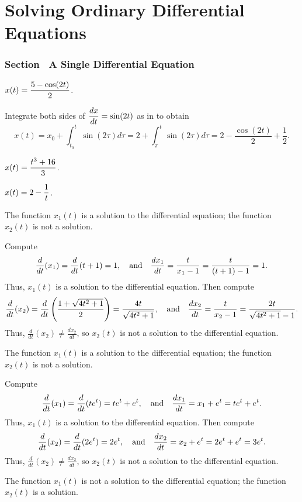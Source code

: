 \chapter{Solving Ordinary Differential Equations}

\subsection*{Section~\protect{\ref{S:growthmodels}} A Single Differential
Equation}

\ans $\displaystyle x(t) = \frac{5 - \cos(2t)}{2}$.

\soln Integrate both sides of $\displaystyle\frac{dx}{dt} = \sin(2t)$ as in
 to obtain
\[
x(t) = x_0 + \int_{t_0}^{t}\sin(2\tau)d\tau =
2 + \int_{\pi}^{t}\sin(2\tau)d\tau = 2 - \frac{\cos(2t)}{2} +
\frac{1}{2}.
\]

 $\displaystyle x(t) = \frac{t^3 + 16}{3}$.

 $\displaystyle x(t) = 2 - \frac{1}{t}$.

\ans The function $x_1(t)$ is a solution to the differential equation;
the function $x_2(t)$ is not a solution.

\soln Compute
\[
\frac{d}{dt}(x_1) = \frac{d}{dt}(t + 1) = 1, \quad\mbox{and}\quad
\frac{dx_1}{dt} = \frac{t}{x_1 - 1} = \frac{t}{(t + 1) - 1} = 1.
\]
Thus, $x_1(t)$ is a solution to the differential equation.  Then compute
\[
\frac{d}{dt}(x_2) = \frac{d}{dt}\left(\frac{1 + \sqrt{4t^2 + 1}}{2}\right)
= \frac{4t}{\sqrt{4t^2 + 1}}, \quad\mbox{and}\quad
\frac{dx_2}{dt} = \frac{t}{x_2 - 1} = \frac{2t}{\sqrt{4t^2 + 1} - 1}.
\]
Thus, $\frac{d}{dt}(x_2) \neq \frac{dx_2}{dt}$, so $x_2(t)$ is not a
solution to the differential equation.

\newpage
{}
\ans The function $x_1(t)$ is a solution to the differential equation;
the function $x_2(t)$ is not a solution.

\soln Compute
\[
\frac{d}{dt}(x_1) = \frac{d}{dt}(te^t) = te^t + e^t, \quad\mbox{and}\quad
\frac{dx_1}{dt} = x_1 + e^t = te^t + e^t.
\]
Thus, $x_1(t)$ is a solution to the differential equation.  Then compute
\[
\frac{d}{dt}(x_2) = \frac{d}{dt}(2e^t) = 2e^t, \quad\mbox{and}\quad
\frac{dx_2}{dt} = x_2 + e^t = 2e^t + e^t = 3e^t.
\]
Thus, $\frac{d}{dt}(x_2) \neq \frac{dx_2}{dt}$, so $x_2(t)$ is not a
solution to the differential equation.

\ans The function $x_1(t)$ is not a solution to the differential equation;
the function $x_2(t)$ is a solution.

